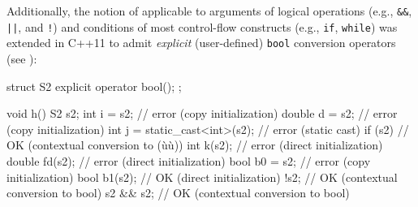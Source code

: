 \noindent Additionally, the notion of  
applicable to arguments of logical operations
(e.g., \lstinline!&&!, \lstinline!||!, and \lstinline|!|) and conditions of
most control-flow constructs (e.g., \lstinline!if!, \lstinline!while!) was
extended in C++11 to admit \emph{explicit} (user-defined) \lstinline!bool!
conversion operators (see ):

\begin{emcppslisting}[language=C++]
struct S2 { explicit operator bool(); };

void h()
{
    S2 s2;
    int i = s2;                    // error (copy initialization)
    double d = s2;                 // error (copy initialization)
    int j = static_cast<int>(s2);  // error (static cast)
    if (s2) { }                    // OK (contextual conversion to (ù{}ù))
    int k(s2);                     // error (direct initialization)
    double fd(s2);                 // error (direct initialization)
    bool b0 = s2; // error (copy initialization)
    bool b1(s2);  // OK (direct initialization)                                     
    !s2;          // OK (contextual conversion to bool)                                                
    s2 && s2;     // OK (contextual conversion to bool)
}
\end{emcppslisting}
    
